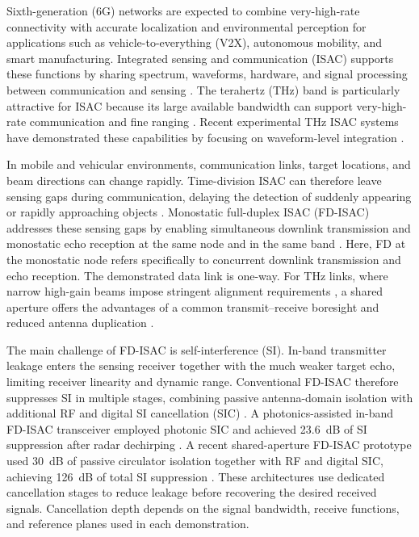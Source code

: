 \documentclass[10pt,journal]{IEEEtran}
\DeclareRobustCommand{\rev}[1]{\textcolor{revisioncolor}{#1}}
\begin{document}
Sixth-generation (6G) networks are expected to combine very-high-rate
connectivity with accurate localization and environmental perception for
applications such as vehicle-to-everything (V2X), autonomous mobility,
and smart manufacturing. Integrated sensing and communication (ISAC)
supports these functions by sharing spectrum, waveforms, hardware, and
signal processing between communication and sensing
\cite{liu_integrated_2022,gonzalez-prelcic_integrated_2024}. The
terahertz (THz) band is particularly attractive for ISAC because its
large available bandwidth can support very-high-rate communication and
fine ranging
\cite{song_terahertz_2022,chaccour_seven_2022,
elbir_Terahertz_2024,zhang_terahertz_2026}. Recent experimental THz ISAC systems have demonstrated these capabilities by focusing on waveform-level integration \cite{jia_unified_2018,lyu_multichannel_2024,shi_310_2026a}.

In mobile and vehicular environments, communication links, target
locations, and beam directions can change rapidly. Time-division ISAC
can therefore leave sensing gaps during communication, delaying the
detection of suddenly appearing or rapidly approaching objects  
\cite{he_nonlinear_2024,zhang_cochannel_2026}. Monostatic full-duplex ISAC (FD-ISAC) addresses these sensing gaps by
enabling simultaneous downlink transmission and monostatic echo
reception at the same node and in the same band
\cite{zhang_inband_2022,duan_frequencydomain_2024,duan_inband_2025,
zhang_cochannel_2026,du_fullduplexbased_2026,du_fullduplex_2026}. Here,
\rev{FD at the monostatic node refers specifically to concurrent downlink
transmission and echo reception. The demonstrated data link is
one-way.} For THz links, where narrow
high-gain beams impose stringent alignment requirements
\cite{sung_practical_2026}, a shared aperture offers the advantages of
a common transmit--receive boresight and reduced antenna duplication
\cite{wu_integrated_2025}.

The main challenge of FD-ISAC is self-interference (SI). In-band
transmitter leakage enters the sensing receiver together with the much
weaker target echo, limiting receiver linearity and dynamic range.
Conventional FD-ISAC therefore suppresses SI in multiple stages,
combining passive antenna-domain isolation with additional RF and digital
SI cancellation (SIC)
\cite{duan_inband_2025,
du_fullduplexbased_2026,du_fullduplex_2026}.
A photonics-assisted in-band FD-ISAC transceiver employed photonic SIC and
achieved 23.6~dB of SI suppression after radar dechirping
\cite{yu_photonicsassisted_2024a}. A recent shared-aperture FD-ISAC
prototype used 30~dB of passive circulator isolation together with RF
and digital SIC, achieving 126~dB of total SI suppression
\cite{du_fullduplex_2026}. \rev{These architectures use dedicated cancellation stages to reduce
leakage before recovering the desired received signals. Cancellation
depth depends on the signal bandwidth, receive functions, and
reference planes used in each demonstration.}
\end{document}
